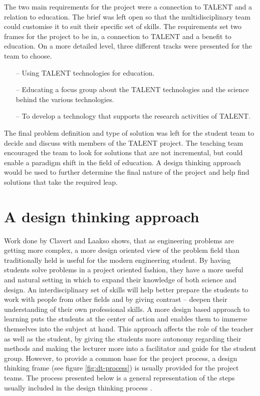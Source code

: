 \documentclass[english,12pt,a4paper,pdftex]{article}
\begin{document}
The two main requirements for the project were a connection to TALENT and a relation to education. The brief was left  open so that the multidisciplinary team could customise it to suit their specific set of skills. The requirements set  two frames for the project to be in, a connection to TALENT and a benefit to education. On a more detailed level, three different tracks were presented for the team to choose.

\begin{itemize}
\item[--]Using TALENT technologies for education.
\item[--]Educating a focus group about the TALENT technologies and the science behind the various technologies.
\item[--]To develop a technology that supports the research activities of TALENT.
\end{itemize}

The final problem definition and type of solution was left for the student team to decide and discuss with members of the TALENT project. The teaching team encouraged the team to look for solutions that are not incremental, but could enable a paradigm shift in the field of education. A design thinking approach would be used to further determine the final nature of the project and help find solutions that take the required leap.


\clearpage

\section{A design thinking approach}

Work done by Clavert and Laakso \cite{Clavert} shows, that as engineering problems are getting more complex, a more design oriented view of the problem field than traditionally held is useful for the modern engineering student. By having students solve problems in a project oriented fashion, they have a more useful and natural setting in which to expand their knowledge of both science and design. An interdisciplinary set of skills will help better prepare the students to work with people from other fields and by giving contrast -- deepen their understanding of their own professional skills. A more design based approach to learning puts the students at the center of action and enables them to immerse themselves into the subject at hand. This approach affects the role of the teacher as well as the student, by giving the students more autonomy regarding their methods and making the lecturer more into a facilitator and guide for the student group. However, to provide a common base for the project process, a design thinking frame (see figure \ref{fig:dt-process}) is usually provided for the project teams. The process presented below is a general representation of the steps usually included in the design thinking process \cite{Brown}. 
\end{document}

